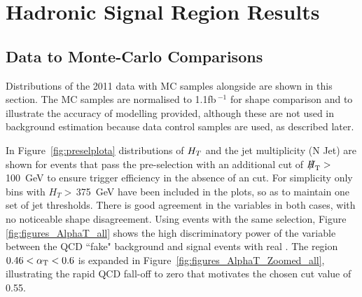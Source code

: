 \section{Hadronic Signal Region Results}
\subsection{Data to Monte-Carlo Comparisons }

Distributions of the 2011 data with MC samples alongside are shown in this section. The MC samples are normalised to 1.1fb\,$^{-1}$ for shape comparison and to illustrate the accuracy of modelling provided, although these are not used in background estimation because data control samples are used, as described later.

In Figure~\ref{fig:preselplota} distributions of $H_{T}$ and the jet multiplicity (N Jet) are shown for events that pass the pre-selection with an additional cut of $\MHT >$ 100~GeV to ensure trigger efficiency in the absence of an \alt cut. For simplicity only bins with $H_{T} > $\,375~GeV have been included in the plots, so as to maintain one set of jet thresholds. There is good agreement in the variables in both cases, with no noticeable shape disagreement. Using events with the same selection, Figure \ref{fig:figures_AlphaT_all} shows the high discriminatory power of the \alt variable between the QCD ``fake" \MET background and signal events with real \MET. The region $0.46 < \alpha_{\text{T}} < 0.6$ is expanded in Figure~\ref{fig:figures_AlphaT_Zoomed_all}, illustrating the rapid QCD fall-off to zero that motivates the chosen cut value of 0.55.

